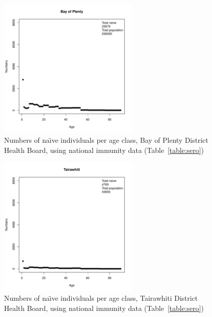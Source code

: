 \documentclass{article}
\begin{document}
\begin{itemize}
\begin{figure}[H]
     \begin{center}
     \includegraphics[width=0.6\textwidth]{dhb7.pdf}
     \end{center}
     \caption{Numbers of na\"{\i}ve individuals per age class, Bay of Plenty District Health Board, using national immunity data (Table~\ref{table:sero})}
     \label{fig:BayofPlenty}
\end{figure}

\begin{figure}[H]
     \begin{center}
     \includegraphics[width=0.6\textwidth]{dhb8.pdf}
     \end{center}
     \caption{Numbers of na\"{\i}ve individuals per age class, Tairawhiti District Health Board, using national immunity data (Table~\ref{table:sero})}
     \label{fig:Tairawhiti}
\end{figure}


\end{itemize}
\end{document}
